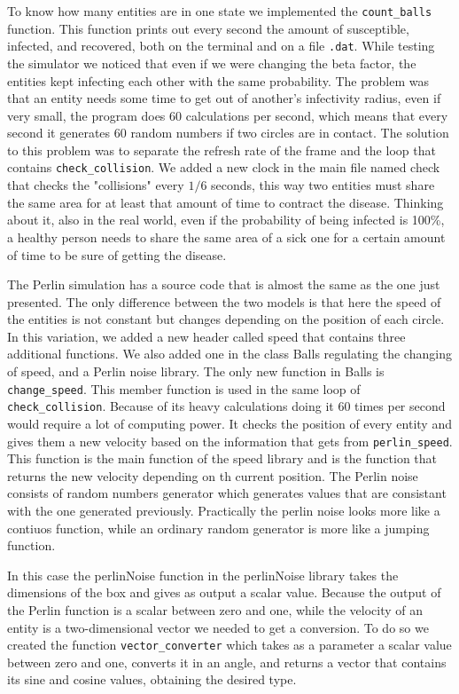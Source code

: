 \documentclass[a4paper, 11pt]{article}
\begin{document}
  To know how many entities are in one state we implemented the \verb|count_balls| function. This function prints out every second the amount of susceptible, infected, and recovered, both on the terminal and on a file \verb|.dat|.
  While testing the simulator we noticed that even if we were changing the beta factor, the entities kept infecting each other with the same probability. The problem was that an entity needs some time to get out of another's infectivity radius, even if very small, the program does 60 calculations per second, which means that every second it generates 60 random numbers if two circles are in contact. The solution to this problem was to separate the refresh rate of the frame and the loop that contains \verb|check_collision|. We added a new clock in the main file named check that checks the "collisions" every $1/6$ seconds, this way two entities must share the same area for at least that amount of time to contract the disease. Thinking about it, also in the real world, even if the probability of being infected is 100\%, a healthy person needs to share the same area of a sick one for a certain amount of time to be sure of getting the disease.

  The Perlin simulation has a source code that is almost the same as the one just presented. The only difference between the two models is that here the speed of the entities is not constant but changes depending on the position of each circle. In this variation, we added a new header called speed that contains three additional functions. We also added one in the class Balls regulating the changing of speed, and a Perlin noise library.
  The only new function in Balls is \verb|change_speed|. This member function is used in the same loop of \verb|check_collision|. Because of its heavy calculations doing it 60 times per second would require a lot of computing power. It checks the position of every entity and gives them a new velocity based on the information that gets from \verb|perlin_speed|.
  This function is the main function of the speed library and is the function that returns the new velocity depending on th current position.
  The Perlin noise consists of random numbers generator which generates values that are consistant with the one generated previously.
  Practically the perlin noise looks more like a contiuos function, while an ordinary random generator is more like a jumping function.

  In this case the perlinNoise function in the perlinNoise library takes the dimensions of the box and gives as output a scalar value.
  Because the output of the Perlin function is a scalar between zero and one, while the velocity of an entity is a two-dimensional vector we needed to get a conversion. To do so we created the function \verb|vector_converter| which takes as a parameter a scalar value between zero and one, converts it in an angle, and returns a vector that contains its sine and cosine values, obtaining the desired type.
\end{document}
